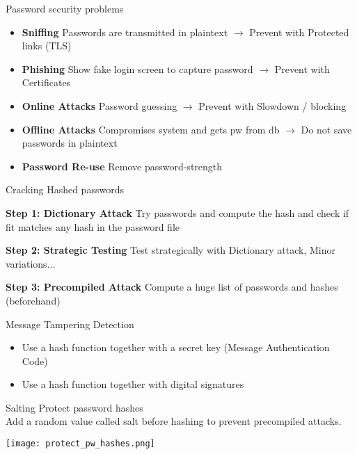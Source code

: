 \begin{definition}{Password security problems}
    \begin{itemize}
        \item \textbf{Sniffing} Passwords are transmitted in plaintext $\rightarrow$ Prevent with Protected links (TLS)
        \item \textbf{Phishing} Show fake login screen to capture password $\rightarrow$ Prevent with Certificates
        \item \textbf{Online Attacks} Password guessing $\rightarrow$ Prevent with Slowdown / blocking
        \item \textbf{Offline Attacks} Compromises system and gets pw from db $\rightarrow$ Do not save passwords in plaintext
        \item \textbf{Password Re-use} Remove password-strength
    \end{itemize}
\end{definition}

\begin{KR}{Cracking Hashed passwords}

    \textbf{Step 1: Dictionary Attack}
    Try passwords and compute the hash and check if fit matches any hash in the password file
    
    \textbf{Step 2: Strategic Testing}
    Test strategically with Dictionary attack, Minor variations...
    
    \textbf{Step 3: Precompiled Attack}
    Compute a huge list of passwords and hashes (beforehand)
\end{KR}

\begin{concept}{Message Tampering Detection}
    \begin{itemize}
        \item Use a hash function together with a secret key (Message Authentication Code)
        \item Use a hash function together with digital signatures
    \end{itemize}
\end{concept}

\begin{concept}{Salting} Protect password hashes\\
    Add a random value called salt before hashing to prevent precompiled attacks.

    \texttt{[image: protect\_pw\_hashes.png]}
\end{concept}

